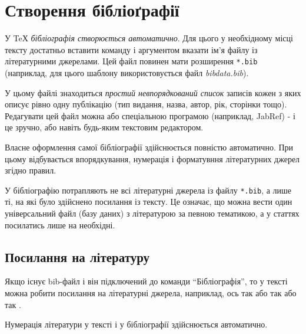 
\chapter{Створення бібліоґрафії}

У TeХ \emph{бібліографія створюється автоматично}. Для цього у необхідному місці тексту достатньо вставити команду \verb|| і аргументом вказати ім'я файлу із літературними джерелами.
Цей файл повинен мати розширення \verb|*.bib| (наприклад, для цього шаблону використовується файл \emph{bibdata.bib}). 

У цьому файлі знаходиться \emph{простий невпорядкований список} записів кожен з яких
описує рівно одну публікацію (тип видання, назва, автор, рік, сторінки тощо). Редагувати цей файл можна або спеціальною програмою (наприклад, JabRef) - і це зручно, або навіть будь-яким текстовим редактором. 

Власне оформлення самої бібліографії здійснюється повністю автоматично. При цьому відбувається впорядкування, нумерація і форматувння літературних джерел згідно правил. 

У бібліографію потрапляють не всі літературні джерела із файлу \verb|*.bib|, а лише ті, на які було здійснено посилання із тексту. Це означає, що можна вести один універсальний файл (базу даних) з літературою за певною тематикою, а у статтях посилатись лише на необхідні.

\section{Посилання на літературу}

Якщо існує bib-файл і він підключений до команди ``Бібліографія'', то у тексті можна робити посилання на літературні джерела, наприклад, ось так \cite{WinNT} або так \cite{Vasylenko92, Afanasyev92} або так \cite{Makilov91, Ponomarenko86, Belousova81, Tezisy, Statia, GOST7184}.

Нумерація літератури у тексті і у бібліографії здійснюється автоматично. 

